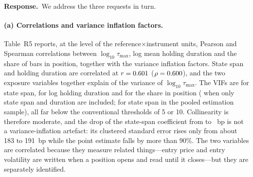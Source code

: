 \documentclass[11pt,a4paper]{article}
\newcommand{\response}{\par\noindent\textbf{Response.}\ }
\begin{document}
\response We address the three requests in turn.

\paragraph{(a) Correlations and variance inflation factors.} Table~R5 reports, at the level of the \RevVifUnitsN{} reference$\times$instrument units, Pearson and Spearman correlations between $\log_{10}\tau_{\max}$, log mean holding duration and the share of bars in position, together with the variance inflation factors. State span and holding duration are correlated at $r=0.601$ ($\rho=0.600$), and the two exposure variables together explain \RevTauOnExpoR{} of the variance of $\log_{10}\tau_{\max}$. The VIFs are \RevVifTau{} for state span, \RevVifDur{} for log holding duration and \RevVifPos{} for the share in position (\RevVifTwoTau{} when only state span and duration are included; \RevVifPooledTau{} for state span in the pooled estimation sample), all far below the conventional thresholds of 5 or 10. Collinearity is therefore moderate, and the drop of the state-span coefficient from \RevRegBaseTau{} to \RevRegExpoTau~bp is not a variance-inflation artefact: its clustered standard error rises only from about 183 to 191~bp while the point estimate falls by more than 90\%. The two variables are correlated because they measure related things---entry price and entry volatility are written when a position opens and read until it closes---but they are separately identified.

\begin{table}[h]\centering\small
\caption*{\textbf{Table R5.} Correlations and variance inflation factors between state span and the two exposure variables, one observation per reference strategy and instrument ($N=\RevVifUnitsN$). Pearson $r$ with Spearman $\rho$ in parentheses; VIF from the regression of each variable on the other two (3 vars) or on state span and duration only.}

\end{table}
\end{document}
